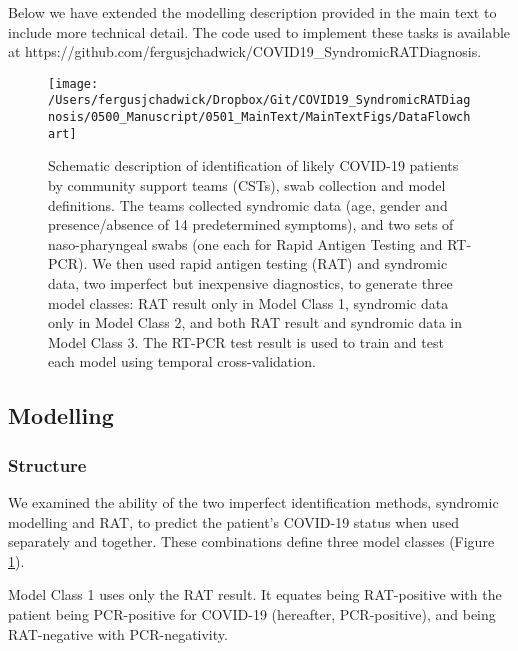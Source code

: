 \documentclass[]{elsarticle} %
\begin{document}
Below we have extended the modelling description provided in the main text to include more technical detail.
The code used to implement these tasks is available at https://github.com/fergusjchadwick/COVID19\_SyndromicRATDiagnosis.

\begin{figure}
\texttt{[image: /Users/fergusjchadwick/Dropbox/Git/COVID19\_SyndromicRATDiagnosis/0500\_Manuscript/0501\_MainText/MainTextFigs/DataFlowchart]} \caption{Schematic description of identification of likely COVID-19 patients by community support teams (CSTs), swab collection and model definitions. The teams collected syndromic data (age, gender and presence/absence of 14 predetermined symptoms), and two sets of naso-pharyngeal swabs (one each for Rapid Antigen Testing and RT-PCR). We then used rapid antigen testing (RAT) and syndromic data, two imperfect but inexpensive diagnostics, to generate three model classes: RAT result only in Model Class 1, syndromic data only in Model Class 2, and both RAT result and syndromic data in Model Class 3. The RT-PCR test result is used to train and test each model using temporal cross-validation.}\label{fig:data-flowchart2}
\end{figure}

\hypertarget{modelling}{%
\subsection{Modelling}\label{modelling}}

\hypertarget{structure}{%
\subsubsection{Structure}\label{structure}}

We examined the ability of the two imperfect identification methods, syndromic modelling and RAT, to predict the patient's COVID-19 status when used separately and together.
These combinations define three model classes (Figure \ref{fig:data-flowchart2}).

Model Class 1 uses only the RAT result.
It equates being RAT-positive with the patient being PCR-positive for COVID-19 (hereafter, PCR-positive), and being RAT-negative with PCR-negativity.
\end{document}
